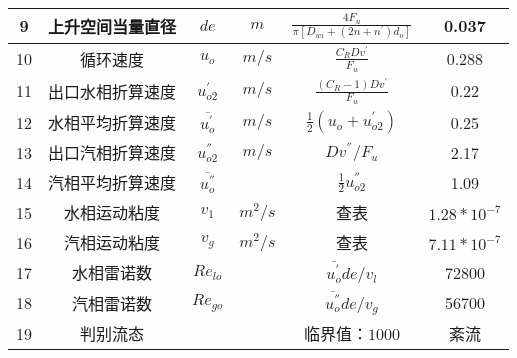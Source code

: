 \begin{table}[H]
{\begin{tabular}{|c|c|c|c|c|c|}
            9    & 上升空间当量直径             & $ de $                    & $ m $      & $ \frac{4F_u}{\pi[D_{wi}+(2n+n^{'})d_o]} $                                                    & 0.037            \\ \hline
            10   & 循环速度                     & $ u_o $                   & $ m/s $    & $ \frac{C_RDv^{'}}{F_u} $                                                                     & 0.288            \\ \hline
            11   & 出口水相折算速度             & $ u_{o2}^{'} $            & $ m/s $    & $ \frac{(C_R - 1)Dv^{'}}{F_u} $                                                               & 0.22             \\ \hline
            12   & 水相平均折算速度             & $ \overline{u_{o}^{'}} $  & $ m/s $    & $ \frac{1}{2}(u_o + u_{o2}^{'}) $                                                             & 0.25             \\ \hline
            13   & 出口汽相折算速度             & $ u_{o2}^{''} $           & $ m/s $    & $ Dv^{''} / F_u $                                                                             & 2.17             \\ \hline
            14   & 汽相平均折算速度             & $ \overline{u_{o}^{''}} $ &            & $ \frac{1}{2}u_{o2}^{''} $                                                                    & 1.09             \\ \hline
            15   & 水相运动粘度                 & $ v_1 $                   & $ m^2/s $  & 查表                                                                                          & $ 1.28*10^{-7} $ \\ \hline
            16   & 汽相运动粘度                 & $ v_g $                   & $ m^2/s $  & 查表                                                                                          & $ 7.11*10^{-7} $ \\ \hline
            17   & 水相雷诺数                   & $ Re_{lo} $               &            & $ \overline{u_{o}^{'}} de / v_l $                                                             & 72800            \\ \hline
            18   & 汽相雷诺数                   & $ Re_{go} $               &            & $ \overline{u_{o}^{''}} de / v_g $                                                            & 56700            \\ \hline
            19   & 判别流态                     &                           &            & 临界值：$ 1000 $                                                                              & 紊流             \\ \hline

\end{tabular}}
\end{table}
